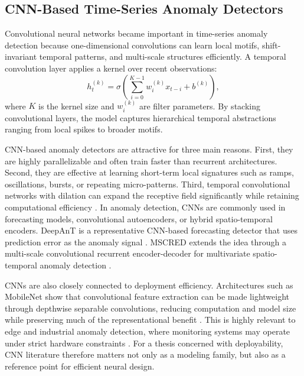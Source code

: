 \subsection{CNN-Based Time-Series Anomaly Detectors}

Convolutional neural networks became important in time-series anomaly detection because one-dimensional convolutions can learn local motifs, shift-invariant temporal patterns, and multi-scale structures efficiently. A temporal convolution layer applies a kernel over recent observations:
\begin{equation}
	h_t^{(k)} = \sigma\!\left(\sum_{i=0}^{K-1} w_i^{(k)} x_{t-i} + b^{(k)} \right),
	\label{eq:sota_cnn}
\end{equation}
where $K$ is the kernel size and $w_i^{(k)}$ are filter parameters. By stacking convolutional layers, the model captures hierarchical temporal abstractions ranging from local spikes to broader motifs.

CNN-based anomaly detectors are attractive for three main reasons. First, they are highly parallelizable and often train faster than recurrent architectures. Second, they are effective at learning short-term local signatures such as ramps, oscillations, bursts, or repeating micro-patterns. Third, temporal convolutional networks with dilation can expand the receptive field significantly while retaining computational efficiency \cite{bai2018tcn}. In anomaly detection, CNNs are commonly used in forecasting models, convolutional autoencoders, or hybrid spatio-temporal encoders. DeepAnT is a representative CNN-based forecasting detector that uses prediction error as the anomaly signal \cite{munir2019deepant}. MSCRED extends the idea through a multi-scale convolutional recurrent encoder-decoder for multivariate spatio-temporal anomaly detection \cite{zhang2019mscred}.

CNNs are also closely connected to deployment efficiency. Architectures such as MobileNet show that convolutional feature extraction can be made lightweight through depthwise separable convolutions, reducing computation and model size while preserving much of the representational benefit \cite{howard2017mobilenets}. This is highly relevant to edge and industrial anomaly detection, where monitoring systems may operate under strict hardware constraints \cite{antonini2023tinyml}. For a thesis concerned with deployability, CNN literature therefore matters not only as a modeling family, but also as a reference point for efficient neural design.

